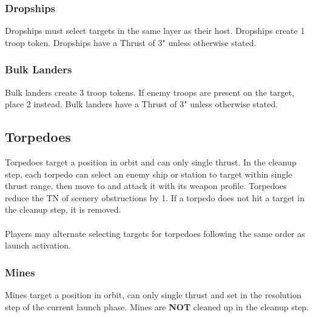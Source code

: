\subsubsection{Dropships}
Dropships must select targets in the same layer as their host. Dropships create 1 troop token. Dropships have a Thrust of 3" unless otherwise stated.

\subsubsection{Bulk Landers}
Bulk landers create 3 troop tokens. If enemy troops are present on the target, place 2 instead. Bulk landers have a Thrust of 3" unless otherwise stated.


\subsection{Torpedoes}
Torpedoes target a position in orbit and can only single thrust. In the cleanup step, each torpedo can select an enemy ship or station to target within single thrust range, then move to and attack it with its weapon profile. Torpedoes reduce the TN of scenery obstructions by 1. If a torpedo does not hit a target in the cleanup step, it is removed.
\\\\
Players may alternate selecting targets for torpedoes following the same order as launch activation.


\subsubsection{Mines}
Mines target a position in orbit, can only single thrust and set in the resolution step of the current launch phase. Mines are \textbf{NOT} cleaned up in the cleanup step.

